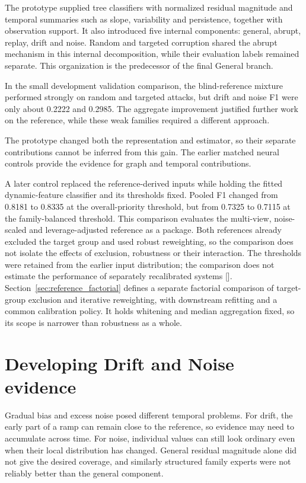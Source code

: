 The prototype supplied tree classifiers with normalized residual magnitude and temporal summaries such as slope, variability and persistence, together with observation support. It also introduced five internal components: general, abrupt, replay, drift and noise. Random and targeted corruption shared the abrupt mechanism in this internal decomposition, while their evaluation labels remained separate. This organization is the predecessor of the final General branch.

In the small development validation comparison, the blind-reference mixture performed strongly on random and targeted attacks, but drift and noise F1 were only about 0.2222 and 0.2985. The aggregate improvement justified further work on the reference, while these weak families required a different approach.

The prototype changed both the representation and estimator, so their separate contributions cannot be inferred from this gain. The earlier matched neural controls provide the evidence for graph and temporal contributions.

A later control replaced the reference-derived inputs while holding the fitted dynamic-feature classifier and its thresholds fixed. Pooled F1 changed from 0.8181 to 0.8335 at the overall-priority threshold, but from 0.7325 to 0.7115 at the family-balanced threshold. This comparison evaluates the multi-view, noise-scaled and leverage-adjusted reference as a package. Both references already excluded the target group and used robust reweighting, so the comparison does not isolate the effects of exclusion, robustness or their interaction. The thresholds were retained from the earlier input distribution; the comparison does not estimate the performance of separately recalibrated systems []. Section~\ref{sec:reference_factorial} defines a separate factorial comparison of target-group exclusion and iterative reweighting, with downstream refitting and a common calibration policy. It holds whitening and median aggregation fixed, so its scope is narrower than robustness as a whole.

\section{Developing Drift and Noise evidence}
Gradual bias and excess noise posed different temporal problems. For drift, the early part of a ramp can remain close to the reference, so evidence may need to accumulate across time. For noise, individual values can still look ordinary even when their local distribution has changed. General residual magnitude alone did not give the desired coverage, and similarly structured family experts were not reliably better than the general component.

